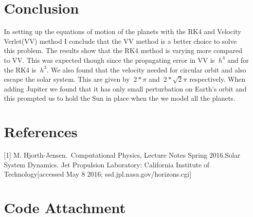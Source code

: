 \documentclass[11pt,a4wide]{article}
\begin{document}

\section{Conclusion}

	In setting up the equations of motion of the planets with the RK4 and Velocity Verlet(VV) method I conclude that the VV method is a better choice to solve this problem. The results show that the RK4 method is varying more compared to VV. This was expected though since the propagating error in VV is $\ h^4$ and for the RK4 is $\ h^3$. We also found that the velocity needed for circular orbit and also escape the solar system. This are given by $\ 2*\pi$ and $\ 2*\sqrt{2}\pi$ respectively. When adding Jupiter we found that it has only small perturbation on Earth's orbit and this prompted us to hold the Sun in place when the we model all the planets. 

\section{References}
[1] M. Hjorth-Jensen.~Computational Physics, Lecture Notes Spring 2016.\break
[2] Solar System Dynamics. Jet Propulsion Laboratory: California Institute of Technology[accessed May 8 2016; ssd.jpl.nasa.gov/horizons.cgi]

\section{Code Attachment}





\end{document}
